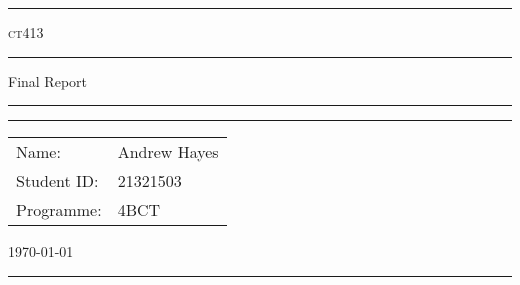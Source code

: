 \documentclass[a4paper,11pt]{article}
\author{Andrew Hayes}
\begin{document}
\begin{titlepage}
    \begin{center}
        \hrule
        \vspace*{0.6cm}
        \Huge \textsc{ct413}
        \vspace*{0.6cm}
        \hrule
        \LARGE
       \vspace{0.5cm}
       Final Report
       \vspace{0.5cm}
       \hrule
       \vfill
       \hrule
        \begin{minipage}{0.495\textwidth} 
            \vspace{0.4em}
            \raggedright
            \normalsize 
            \begin{tabular}{@{}l l}
                Name: & Andrew Hayes \\
                Student ID: & 21321503 \\
                Programme: & 4BCT
            \end{tabular}
        \end{minipage}
        \begin{minipage}{0.495\textwidth} 
            \raggedleft
            \vspace*{0.8cm}
            \Large
            \today
            \vspace*{0.6cm}
        \end{minipage}
        \medskip\hrule 
    \end{center}
\end{titlepage}

\newpage
\tableofcontents
\newpage
\setcounter{page}{1}
\end{document}
